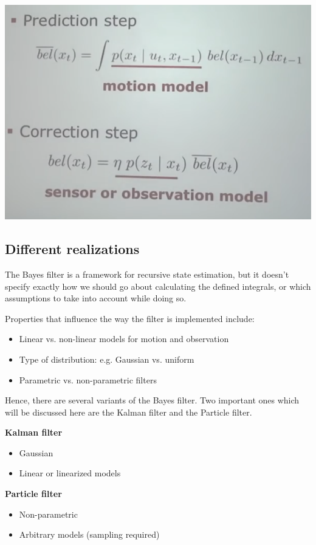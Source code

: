 \documentclass[a4paper]{article}
\begin{document}
\begin{center}
\includegraphics[scale=0.5]{pcmodels}
\end{center}

\subsection{Different realizations}

The Bayes filter is a framework for recursive state estimation, but it doesn't specify exactly how we should go about calculating the defined integrals, or which assumptions to take into account while doing so.

Properties that influence the way the filter is implemented include:
\begin{itemize}
    \item Linear vs. non-linear models for motion and observation
    \item Type of distribution: e.g. Gaussian vs. uniform
    \item Parametric vs. non-parametric filters
\end{itemize}

Hence, there are several variants of the Bayes filter. Two important ones which will be discussed here are the Kalman filter and the Particle filter.

\textbf{Kalman filter}
\begin{itemize}
    \item Gaussian
    \item Linear or linearized models
\end{itemize}

\textbf{Particle filter}
\begin{itemize}
    \item Non-parametric
    \item Arbitrary models (sampling required)
\end{itemize}
\end{document}
